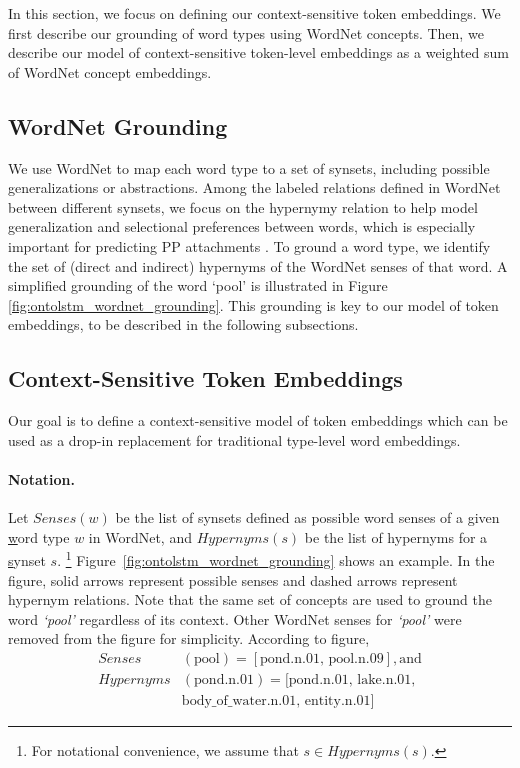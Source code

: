 In this section, we focus on defining our context-sensitive token embeddings. 
We first describe our grounding of word types using WordNet concepts.
Then, we describe our model of context-sensitive token-level embeddings as a weighted sum of WordNet concept embeddings. 

\subsection{WordNet Grounding}
We use WordNet to map each word type to a set of synsets, including possible generalizations or abstractions. 
Among the labeled relations defined in WordNet between different synsets, we focus on the hypernymy relation to help model generalization and selectional preferences between words, which is especially important for predicting PP attachments \citep{resnik:93}.
To ground a word type, we identify the set of (direct and indirect) hypernyms of the WordNet senses of that word.
A simplified grounding of the word `pool' is illustrated in Figure \ref{fig:ontolstm_wordnet_grounding}.
This grounding is key to our model of token embeddings, to be described in the following subsections. 

\subsection{Context-Sensitive Token Embeddings}
\label{sec:ontolstm_embedding_model}

Our goal is to define a context-sensitive model of token embeddings which can be used as a drop-in replacement for traditional type-level word embeddings.

\paragraph{Notation.}
Let $\textit{Senses}(w)$ be the list of synsets defined as possible word senses of a given \underline{w}ord type $w$ in WordNet, and $\textit{Hypernyms}(s)$ be the list of hypernyms for a \underline{s}ynset $s$.
\footnote{For notational convenience, we assume that $s \in \textit{Hypernyms}(s)$.} Figure~\ref{fig:ontolstm_wordnet_grounding} shows an example. In the figure, solid arrows
represent possible senses and dashed arrows represent hypernym relations. Note that the same set of concepts are used to ground the word \textit{`pool'} regardless of its context.
Other WordNet senses for \textit{`pool'} were removed from the figure for simplicity. According to figure, 
\begin{align}
\textit{Senses}&(\text{pool}) = [\text{pond.n.01, pool.n.09}], \text{and} \nonumber \\
\textit{Hypernyms}&(\text{pond.n.01}) = [\text{pond.n.01, lake.n.01}, \nonumber \\
&\text{body\_of\_water.n.01, entity.n.01}] \nonumber
\end{align}

